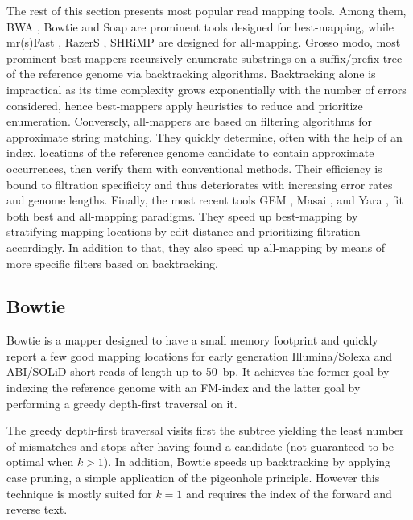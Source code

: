 The rest of this section presents most popular read mapping tools.
Among them, BWA \citep{Li2009,Li2010a}, Bowtie \citep{Langmead2009,Langmead2012} and Soap \citep{Li2009b} are prominent tools designed for best-mapping, while mr(s)Fast \citep{Alkan2009,Hach2010}, RazerS \citep{Weese2009,Weese2012}, SHRiMP \citep{Rumble2009,David2011} are designed for all-mapping.
Grosso modo, most prominent best-mappers recursively enumerate substrings on a suffix/prefix tree of the reference genome via backtracking algorithms.
Backtracking alone is impractical as its time complexity grows exponentially with the number of errors considered, hence best-mappers apply heuristics to reduce and prioritize enumeration.
Conversely, all-mappers are based on filtering algorithms for approximate string matching.
They quickly determine, often with the help of an index, locations of the reference genome candidate to contain approximate occurrences, then verify them with conventional methods.
Their efficiency is bound to filtration specificity and thus deteriorates with increasing error rates and genome lengths.
Finally, the most recent tools GEM \citep{MarcoSola2012}, Masai \citep{Siragusa2013}, and Yara \citep{Siragusa2014}, fit both best and all-mapping paradigms.
They speed up best-mapping by stratifying mapping locations by edit distance and prioritizing filtration accordingly.
In addition to that, they also speed up all-mapping by means of more specific filters based on backtracking.



\subsection{Bowtie}

Bowtie \citep{Langmead2009} is a mapper designed to have a small memory footprint and quickly report a few good mapping locations for early generation Illumina/Solexa and ABI/SOLiD short reads of length up to 50~bp.
It achieves the former goal by indexing the reference genome with an FM-index and the latter goal by performing a greedy depth-first traversal on it.

The greedy depth-first traversal visits first the subtree yielding the least number of mismatches and stops after having found a candidate (not guaranteed to be optimal when $k>1$).
In addition, Bowtie speeds up backtracking by applying case pruning, a simple application of the pigeonhole principle.
However this technique is mostly suited for $k=1$ and requires the index of the forward and reverse text.

